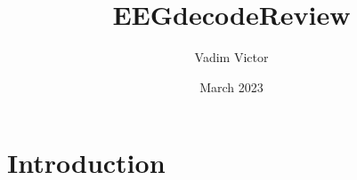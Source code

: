 \documentclass{article}
\title{EEGdecodeReview}
\author{Vadim Victor}
\date{March 2023}
\begin{document}
\maketitle

\section{Introduction}
\end{document}
